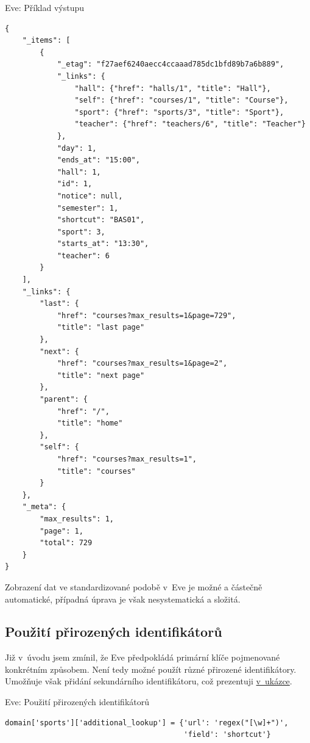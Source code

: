 \begin{listing}[htbp]
\caption{{\label{code:eve:out}Eve: Příklad výstupu}}
\begin{verbatim}
{
    "_items": [
        {
            "_etag": "f27aef6240aecc4ccaaad785dc1bfd89b7a6b889",
            "_links": {
                "hall": {"href": "halls/1", "title": "Hall"},
                "self": {"href": "courses/1", "title": "Course"},
                "sport": {"href": "sports/3", "title": "Sport"},
                "teacher": {"href": "teachers/6", "title": "Teacher"}
            },
            "day": 1,
            "ends_at": "15:00",
            "hall": 1,
            "id": 1,
            "notice": null,
            "semester": 1,
            "shortcut": "BAS01",
            "sport": 3,
            "starts_at": "13:30",
            "teacher": 6
        }
    ],
    "_links": {
        "last": {
            "href": "courses?max_results=1&page=729",
            "title": "last page"
        },
        "next": {
            "href": "courses?max_results=1&page=2",
            "title": "next page"
        },
        "parent": {
            "href": "/",
            "title": "home"
        },
        "self": {
            "href": "courses?max_results=1",
            "title": "courses"
        }
    },
    "_meta": {
        "max_results": 1,
        "page": 1,
        "total": 729
    }
}
\end{verbatim}
\end{listing}

Zobrazení dat ve standardizované podobě v~Eve je možné a částečně automatické, případná úprava je však nesystematická a složitá.

\subsection{Použití přirozených identifikátorů}\label{pouux17eituxed-pux159irozenuxfdch-identifikuxe1torux16f}

Již v~úvodu jsem zmínil, že Eve předpokládá primární klíče pojmenované konkrétním způsobem. Není tedy možné použít různé přirozené identifikátory. Umožňuje však přidání sekundárního identifikátoru, což prezentuji \protect\hyperlink{code:eve:ids}{v~ukázce}.

\begin{listing}[htbp]
\caption{{\label{code:eve:ids}Eve: Použití přirozených identifikátorů}}
\begin{verbatim}
domain['sports']['additional_lookup'] = {'url': 'regex("[\w]+")',
                                         'field': 'shortcut'}
\end{verbatim}
\end{listing}

